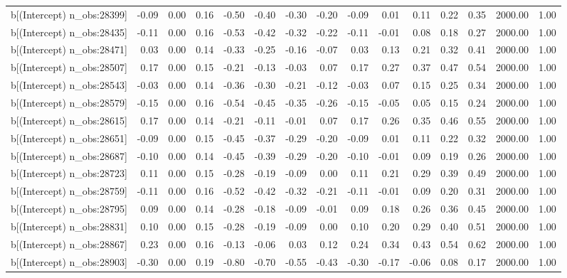 \begin{table}[ht]
\begin{tabular}{rrrrrrrrrrrrrrr}
  b[(Intercept) n\_obs:28399] & -0.09 & 0.00 & 0.16 & -0.50 & -0.40 & -0.30 & -0.20 & -0.09 & 0.01 & 0.11 & 0.22 & 0.35 & 2000.00 & 1.00 \\ 
  b[(Intercept) n\_obs:28435] & -0.11 & 0.00 & 0.16 & -0.53 & -0.42 & -0.32 & -0.22 & -0.11 & -0.01 & 0.08 & 0.18 & 0.27 & 2000.00 & 1.00 \\ 
  b[(Intercept) n\_obs:28471] & 0.03 & 0.00 & 0.14 & -0.33 & -0.25 & -0.16 & -0.07 & 0.03 & 0.13 & 0.21 & 0.32 & 0.41 & 2000.00 & 1.00 \\ 
  b[(Intercept) n\_obs:28507] & 0.17 & 0.00 & 0.15 & -0.21 & -0.13 & -0.03 & 0.07 & 0.17 & 0.27 & 0.37 & 0.47 & 0.54 & 2000.00 & 1.00 \\ 
  b[(Intercept) n\_obs:28543] & -0.03 & 0.00 & 0.14 & -0.36 & -0.30 & -0.21 & -0.12 & -0.03 & 0.07 & 0.15 & 0.25 & 0.34 & 2000.00 & 1.00 \\ 
  b[(Intercept) n\_obs:28579] & -0.15 & 0.00 & 0.16 & -0.54 & -0.45 & -0.35 & -0.26 & -0.15 & -0.05 & 0.05 & 0.15 & 0.24 & 2000.00 & 1.00 \\ 
  b[(Intercept) n\_obs:28615] & 0.17 & 0.00 & 0.14 & -0.21 & -0.11 & -0.01 & 0.07 & 0.17 & 0.26 & 0.35 & 0.46 & 0.55 & 2000.00 & 1.00 \\ 
  b[(Intercept) n\_obs:28651] & -0.09 & 0.00 & 0.15 & -0.45 & -0.37 & -0.29 & -0.20 & -0.09 & 0.01 & 0.11 & 0.22 & 0.32 & 2000.00 & 1.00 \\ 
  b[(Intercept) n\_obs:28687] & -0.10 & 0.00 & 0.14 & -0.45 & -0.39 & -0.29 & -0.20 & -0.10 & -0.01 & 0.09 & 0.19 & 0.26 & 2000.00 & 1.00 \\ 
  b[(Intercept) n\_obs:28723] & 0.11 & 0.00 & 0.15 & -0.28 & -0.19 & -0.09 & 0.00 & 0.11 & 0.21 & 0.29 & 0.39 & 0.49 & 2000.00 & 1.00 \\ 
  b[(Intercept) n\_obs:28759] & -0.11 & 0.00 & 0.16 & -0.52 & -0.42 & -0.32 & -0.21 & -0.11 & -0.01 & 0.09 & 0.20 & 0.31 & 2000.00 & 1.00 \\ 
  b[(Intercept) n\_obs:28795] & 0.09 & 0.00 & 0.14 & -0.28 & -0.18 & -0.09 & -0.01 & 0.09 & 0.18 & 0.26 & 0.36 & 0.45 & 2000.00 & 1.00 \\ 
  b[(Intercept) n\_obs:28831] & 0.10 & 0.00 & 0.15 & -0.28 & -0.19 & -0.09 & 0.00 & 0.10 & 0.20 & 0.29 & 0.40 & 0.51 & 2000.00 & 1.00 \\ 
  b[(Intercept) n\_obs:28867] & 0.23 & 0.00 & 0.16 & -0.13 & -0.06 & 0.03 & 0.12 & 0.24 & 0.34 & 0.43 & 0.54 & 0.62 & 2000.00 & 1.00 \\ 
  b[(Intercept) n\_obs:28903] & -0.30 & 0.00 & 0.19 & -0.80 & -0.70 & -0.55 & -0.43 & -0.30 & -0.17 & -0.06 & 0.08 & 0.17 & 2000.00 & 1.00 \\ 

\end{tabular}
\end{table}
